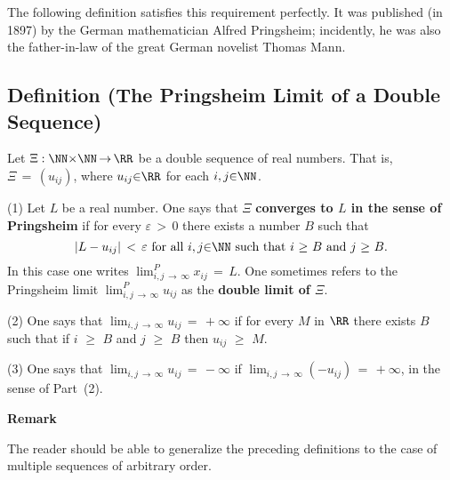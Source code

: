 {\V

        The following definition satisfies this requirement perfectly. It was published (in 1897) by the German mathematician Alfred Pringsheim;
    incidently, he was also the father-in-law of the great German novelist Thomas Mann.

\V

            \subsection{\small{\bf Definition} (The Pringsheim Limit of a Double Sequence)}
            \label{DefC100.100}

\V


        Let ${\Xi}:{\NN}{\times}{\NN} \,{\rightarrow}\, {\RR}$ be a double sequence of real numbers.
    That is, ${\Xi} \,=\, (u_{ij})$, where $u_{ij}{\in}{\RR}$ for each $i,j{\in}{\NN}$.

\V

        (1) Let $L$ be a real number. One says that ${\Xi}$ {\bf converges to $L$ in the sense of Pringsheim} if for every ${\varepsilon}\,>\,0$ there exists a number $B$ such that
        \begin{displaymath}
        |L- u_{ij}|\,<\,{\varepsilon} \mbox{ for all $i,j{\in}{\NN}$ such that $i\,\,{\geq}\,\,B$ and $j\,\,{\geq}\,\,B$}.
        \end{displaymath}
    In this case one writes $\lim_{i,j \,{\rightarrow}\, {\infty}}^{P} x_{ij} \,=\, L$.
    One sometimes refers to the Pringsheim limit $\lim_{i,j \,{\rightarrow}\, {\infty}}^{P} u_{ij}$ as the {\bf double limit of ${\Xi}$}.

\V

        (2) One says that $\lim_{i,j \,{\rightarrow}\, {\infty}} u_{ij} \,=\, +{\infty}$ if for every $M$ in ${\RR}$ there exists $B$ such that if $i\,\,{\geq}\,\,B$ and $j\,\,{\geq}\,\,B$ then $u_{ij}\,\,{\geq}\,\,M$.

\V

        (3) One says that $\lim_{i,j \,{\rightarrow}\, {\infty}} u_{ij} \,=\, -{\infty}$ if $\lim_{i,j \,{\rightarrow}\, {\infty}} (-u_{ij}) \,=\, +{\infty}$, in the sense of Part~(2).

\V
\V

        {\bf Remark}

        The reader should be able to generalize the preceding definitions to the case of multiple sequences of arbitrary order.


\V
\V

}
